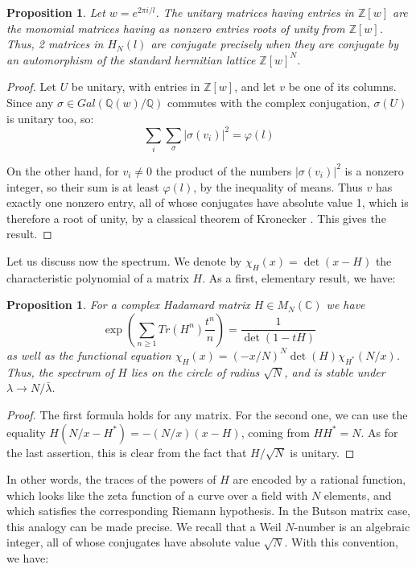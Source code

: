 \documentclass[11pt]{amsart}
\newtheorem{proposition}[theorem]{Proposition}
\theoremstyle{definition}
\begin{document}
\begin{proposition}\label{pmon}
Let $w=e^{2\pi i/l}$. The unitary matrices having entries in $\mathbb Z[w]$ are the monomial matrices having as nonzero entries roots of unity from $\mathbb Z[w]$. Thus, 2 matrices in $H_N(l)$ are conjugate precisely when they are conjugate by an automorphism of the standard hermitian lattice $\mathbb Z[w]^N$.
\end{proposition}

\begin{proof}
Let $U$ be unitary, with entries in $\mathbb Z[w]$, and let $v$ be one of its columns. Since any $\sigma\in Gal(\mathbb Q(w)/\mathbb Q)$ commutes with the complex conjugation, $\sigma(U)$ is unitary too, so:
$$\sum_i\sum_\sigma|\sigma(v_i)|^2=\varphi(l)$$

On the other hand, for $v_i\neq0$ the product of the numbers $|\sigma(v_i)|^2$ is a nonzero integer, so their sum is at least $\varphi(l)$, by the inequality of means. Thus $v$ has exactly one nonzero entry, all of whose conjugates have absolute value 1, which is therefore a root of unity, by a classical theorem of Kronecker \cite{kro}. This gives the result.
\end{proof}

Let us discuss now the spectrum. We denote by $\chi_H(x)=\det(x-H)$ the characteristic polynomial of a matrix $H$. As a first, elementary result, we have:

\begin{proposition}\label{pzeta}
For a complex Hadamard matrix $H\in M_N(\mathbb C)$ we have
$$\exp\left(\sum_{n\geq1}Tr(H^n)\frac{t^n}{n}\right)=\frac{1}{\det(1-tH)}$$
as well as the functional equation $\chi_H(x)=(-x/N)^N\det(H)\chi_{H^*}(N/x)$. Thus, the spectrum of $H$ lies on the circle of radius $\sqrt{N}$, and is stable under $\lambda\to N/\bar{\lambda}$.
\end{proposition}

\begin{proof}
The first formula holds for any matrix. For the second one, we can use the equality $H(N/x-H^*)=-(N/x)(x-H)$, coming from $HH^*=N$. As for the last assertion, this is clear from the fact that $H/\sqrt{N}$ is unitary.
\end{proof}

In other words, the traces of the powers of $H$ are encoded by a rational function, which looks like the zeta function of a curve over a field with $N$ elements, and which satisfies the corresponding Riemann hypothesis. In the Butson matrix case, this analogy can be made precise. We recall that a Weil $N$-number is an algebraic integer, all of whose conjugates have absolute value $\sqrt{N}$. With this convention, we have:
\end{document}
